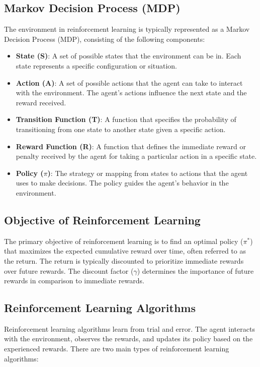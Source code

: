 \documentclass{article}
\begin{document}
\subsection{Markov Decision Process (MDP)}
The environment in reinforcement learning is typically represented as a Markov Decision Process (MDP), consisting of the following components:

\begin{itemize}
    \item \textbf{State (S)}: A set of possible states that the environment can be in. Each state represents a specific configuration or situation.
    
    \item \textbf{Action (A)}: A set of possible actions that the agent can take to interact with the environment. The agent's actions influence the next state and the reward received.
    
    \item \textbf{Transition Function (T)}: A function that specifies the probability of transitioning from one state to another state given a specific action.
    
    \item \textbf{Reward Function (R)}: A function that defines the immediate reward or penalty received by the agent for taking a particular action in a specific state.
    
    \item \textbf{Policy ($\pi$)}: The strategy or mapping from states to actions that the agent uses to make decisions. The policy guides the agent's behavior in the environment.
\end{itemize}

\subsection{Objective of Reinforcement Learning}
The primary objective of reinforcement learning is to find an optimal policy ($\pi^*$) that maximizes the expected cumulative reward over time, often referred to as the return. The return is typically discounted to prioritize immediate rewards over future rewards. The discount factor ($\gamma$) determines the importance of future rewards in comparison to immediate rewards.

\subsection{Reinforcement Learning Algorithms}
Reinforcement learning algorithms learn from trial and error. The agent interacts with the environment, observes the rewards, and updates its policy based on the experienced rewards. There are two main types of reinforcement learning algorithms:
\end{document}
